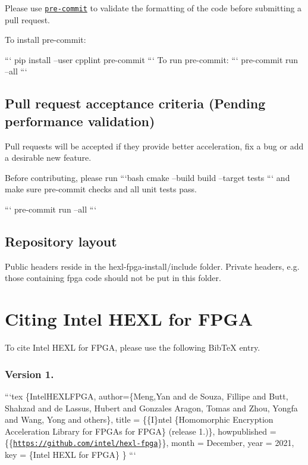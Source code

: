Please use \href{https://pre-commit.com/}{\tt pre-\/commit} to validate the formatting of the code before submitting a pull request. \par
 To install pre-\/commit\-: \par
 ``` pip install --user cpplint pre-\/commit ``` To run pre-\/commit\-: ``` pre-\/commit run --all ```

\subsection*{Pull request acceptance criteria (Pending performance validation)}

Pull requests will be accepted if they provide better acceleration, fix a bug or add a desirable new feature.

Before contributing, please run ```bash cmake --build build --target tests ``` and make sure pre-\/commit checks and all unit tests pass. \par


``` pre-\/commit run --all ```

\subsection*{Repository layout}

Public headers reside in the {\ttfamily hexl-\/fpga-\/install/include} folder. Private headers, e.\-g. those containing fpga code should not be put in this folder.

\section*{Citing Intel H\-E\-X\-L for F\-P\-G\-A}

To cite Intel H\-E\-X\-L for F\-P\-G\-A, please use the following Bib\-Te\-X entry.

\subsubsection*{Version 1.}

```tex \{Intel\-H\-E\-X\-L\-F\-P\-G\-A, author=\{Meng,Yan and de Souza, Fillipe and Butt, Shahzad and de Lassus, Hubert and Gonzales Aragon, Tomas and Zhou, Yongfa and Wang, Yong and others\}, title = \{\{I\}ntel \{Homomorphic Encryption Acceleration Library for F\-P\-G\-As for F\-P\-G\-A\} (release 1.)\}, howpublished = \{\{\href{https://github.com/intel/hexl-fpga}{\tt https\-://github.\-com/intel/hexl-\/fpga}\}\}, month = December, year = 2021, key = \{Intel H\-E\-X\-L for F\-P\-G\-A\} \} ```

